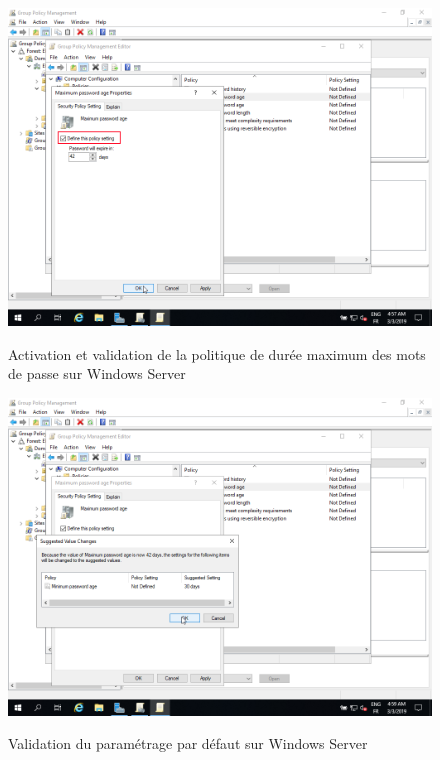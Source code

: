 \begin{figure}[h!]
	\begin{center}
		\caption{Activation et validation de la politique de durée maximum des mots de passe sur Windows Server}
		\includegraphics[scale=0.5]{WS_Screenshots/gpo_6.png}
		\label{WS_Screenshots/gpo_6}
	\end{center}
\end{figure}
\FloatBarrier 
    

\begin{figure}[h!]
	\begin{center}
		\caption{Validation du paramétrage par défaut sur Windows Server}
		\includegraphics[scale=0.5]{WS_Screenshots/gpo_7.png}
		\label{WS_Screenshots/gpo_7}
	\end{center}
\end{figure}
\FloatBarrier 
    

